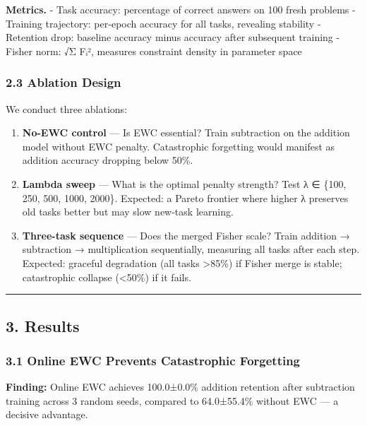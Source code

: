 \documentclass[
]{article}
\begin{document}
\textbf{Metrics.} - Task accuracy: percentage of correct answers on 100
fresh problems - Training trajectory: per-epoch accuracy for all tasks,
revealing stability - Retention drop: baseline accuracy minus accuracy
after subsequent training - Fisher norm: √Σ Fᵢ², measures constraint
density in parameter space

\subsubsection{2.3 Ablation Design}\label{ablation-design}

We conduct three ablations:

\begin{enumerate}
\def\labelenumi{\arabic{enumi}.}
\item
  \textbf{No-EWC control} --- Is EWC essential? Train subtraction on the
  addition model without EWC penalty. Catastrophic forgetting would
  manifest as addition accuracy dropping below 50\%.
\item
  \textbf{Lambda sweep} --- What is the optimal penalty strength? Test λ
  ∈ \{100, 250, 500, 1000, 2000\}. Expected: a Pareto frontier where
  higher λ preserves old tasks better but may slow new-task learning.
\item
  \textbf{Three-task sequence} --- Does the merged Fisher scale? Train
  addition → subtraction → multiplication sequentially, measuring all
  tasks after each step. Expected: graceful degradation (all tasks
  \textgreater85\%) if Fisher merge is stable; catastrophic collapse
  (\textless50\%) if it fails.
\end{enumerate}

\begin{center}\rule{0.5\linewidth}{0.5pt}\end{center}

\subsection{3. Results}\label{results}

\subsubsection{3.1 Online EWC Prevents Catastrophic
Forgetting}\label{online-ewc-prevents-catastrophic-forgetting}

\textbf{Finding:} Online EWC achieves 100.0±0.0\% addition retention
after subtraction training across 3 random seeds, compared to
64.0±55.4\% without EWC --- a decisive advantage.
\end{document}
